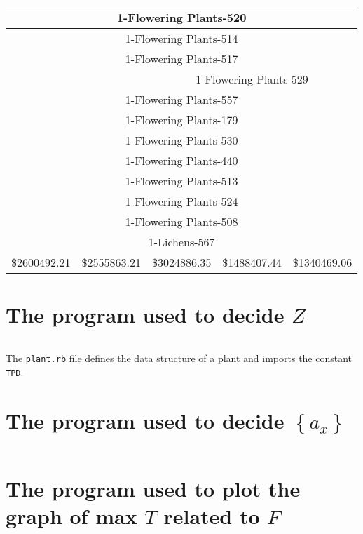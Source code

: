 \documentclass{article}
\begin{document}
\begin{table}[h!]
\begin{tabular}{|p{1.8cm}|p{1.8cm}|p{1.8cm}|p{1.8cm}|p{1.8cm}|}
\multicolumn{5}{|c|}{1-Flowering Plants-520}\\\hline
\multicolumn{5}{|c|}{1-Flowering Plants-514}\\\hline
\multicolumn{5}{|c|}{1-Flowering Plants-517}\\\hline
& & \multicolumn{3}{c|}{1-Flowering Plants-529}\\\hline
\multicolumn{5}{|c|}{1-Flowering Plants-557}\\\hline
\multicolumn{5}{|c|}{1-Flowering Plants-179}\\\hline
\multicolumn{5}{|c|}{1-Flowering Plants-530}\\\hline
\multicolumn{5}{|c|}{1-Flowering Plants-440}\\\hline
\multicolumn{5}{|c|}{1-Flowering Plants-513}\\\hline
\multicolumn{5}{|c|}{1-Flowering Plants-524}\\\hline
\multicolumn{5}{|c|}{1-Flowering Plants-508}\\\hline
\multicolumn{5}{|c|}{1-Lichens-567}\\\hline
\hline
\$2600492.21 & \$2555863.21 & \$3024886.35 & \$1488407.44 & \$1340469.06\\
\hline
\end{tabular}
\end{table}

\newpage

\appendix

\section{The program used to decide $Z$}
\label{appendix:prog min T}

\inputminted{ruby}{../knappack.rb}

The \texttt{plant.rb} file defines the data structure of a plant and imports the constant \texttt{TPD}.

\section{The program used to decide $\left\{a_x\right\}$}

\inputminted{ruby}{../min_variance.rb}

\section{The program used to plot the graph of max $T$ related to $F$}
\end{document}
